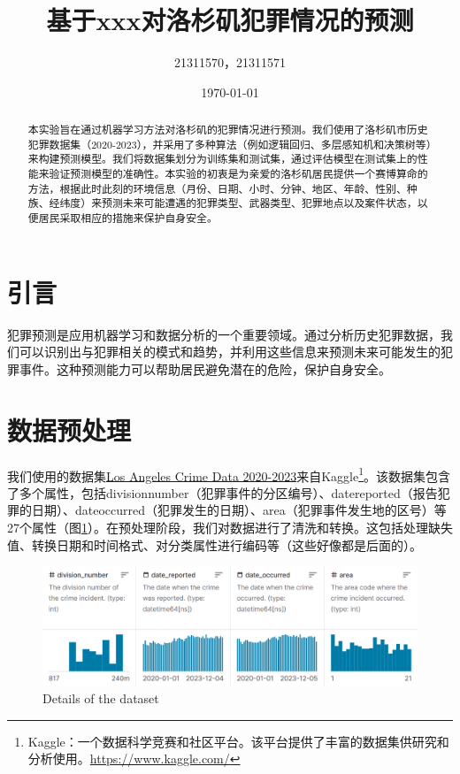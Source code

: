 \documentclass{article}
\begin{document}
\sloppy %

\title{基于xxx对洛杉矶犯罪情况的预测}
\author{21311570，21311571}
\date{\today}

\maketitle

\renewcommand{\abstractname}{摘要}  %

\begin{abstract}
    本实验旨在通过机器学习方法对洛杉矶的犯罪情况进行预测。我们使用了洛杉矶市历史犯罪数据集（2020-2023），并采用了多种算法（例如逻辑回归、多层感知机和决策树等）来构建预测模型。我们将数据集划分为训练集和测试集，通过评估模型在测试集上的性能来验证预测模型的准确性。本实验的初衷是为亲爱的洛杉矶居民提供一个赛博算命的方法，根据此时此刻的环境信息（月份、日期、小时、分钟、地区、年龄、性别、种族、经纬度）来预测未来可能遭遇的犯罪类型、武器类型、犯罪地点以及案件状态，以便居民采取相应的措施来保护自身安全。
\end{abstract}

\section{引言}
犯罪预测是应用机器学习和数据分析的一个重要领域。通过分析历史犯罪数据，我们可以识别出与犯罪相关的模式和趋势，并利用这些信息来预测未来可能发生的犯罪事件。这种预测能力可以帮助居民避免潜在的危险，保护自身安全。

\section{数据预处理}
我们使用的数据集\href{https://www.kaggle.com/datasets/asaniczka/crimes-in-los-angeles-2020-2023/data}{Los Angeles Crime Data 2020-2023}来自Kaggle\footnote{Kaggle：一个数据科学竞赛和社区平台。该平台提供了丰富的数据集供研究和分析使用。\url{https://www.kaggle.com/}}。该数据集包含了多个属性，包括division\textunderscore{}number（犯罪事件的分区编号）、date\textunderscore{}reported（报告犯罪的日期）、date\textunderscore{}occurred（犯罪发生的日期）、area（犯罪事件发生地的区号）等27个属性（图\ref{fig:Details}）。在预处理阶段，我们对数据进行了清洗和转换。这包括处理缺失值、转换日期和时间格式、对分类属性进行编码等（这些好像都是后面的）。

\begin{figure}[H]
    \centering
    \includegraphics[width=1\textwidth]{../pic/Screenshot 2024-01-12 111029.png}
    \caption{Details of the dataset}
    \label{fig:Details}
\end{figure}
\end{document}
